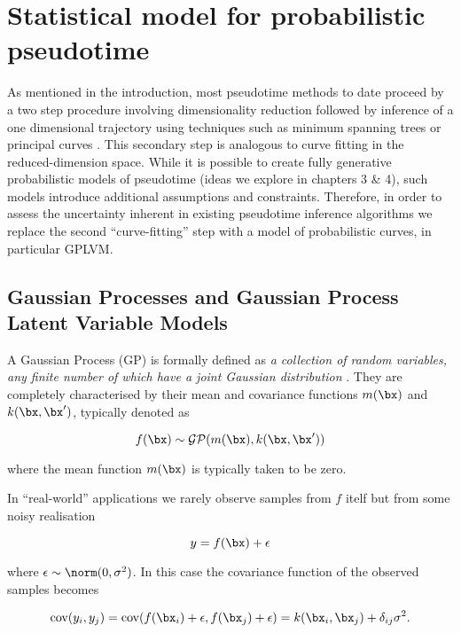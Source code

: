 \section{Statistical model for probabilistic pseudotime}

As mentioned in the introduction, most pseudotime methods to date proceed by a two step procedure involving dimensionality reduction followed by inference of a one dimensional trajectory using techniques such as minimum spanning trees \cite{Trapnell2014,ji2016tscan} or principal curves \cite{Marco2014,campbell2015laplacian,cannoodt2016scorpius}. This secondary step is analogous to curve fitting in the reduced-dimension space. While it is possible to create fully generative probabilistic models of pseudotime (ideas we explore in chapters 3 \& 4), such models introduce additional assumptions and constraints. Therefore, in order to assess the uncertainty inherent in existing pseudotime inference algorithms we replace the second ``curve-fitting'' step with a model of probabilistic curves, in particular GPLVM.

\subsection{Gaussian Processes and Gaussian Process Latent Variable Models}

A Gaussian Process (GP) is formally defined as \emph{a collection of random variables, any finite number of which have a joint Gaussian distribution} \cite{rasmussen2006gaussian}. They are completely characterised by their mean and covariance functions $m(\bx)$ and $k(\bx, \bx')$, typically denoted as

\begin{equation}
	f(\bx) \sim \mathcal{GP}(m(\bx), k(\bx, \bx'))
\end{equation}

where the mean function $m(\bx)$ is typically taken to be zero.

In ``real-world'' applications we rarely observe samples from $f$ itelf but from some noisy realisation

\begin{equation}
	y = f(\bx) + \epsilon
\end{equation}

where $\epsilon \sim \norm(0, \sigma^2)$. In this case the covariance function of the observed samples becomes

\begin{equation}
	\text{cov}(y_i, y_j) = \text{cov}(f(\bx_i) + \epsilon, f(\bx_j) + \epsilon) = k(\bx_i, \bx_j) + \delta_{ij} \sigma^2.
\end{equation}

